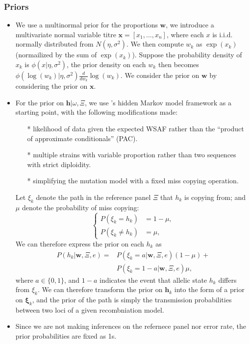 \documentclass{bioinfo}
\begin{document}
\subsubsection{Priors}
\begin{itemize}
\item We use a multinormal prior for the proportions $\mathbf{w}$, we introduce a multivariate normal variable titre ${\mathbf x} = [x_1,\dots,x_n]$, where each $x$ is i.i.d. normally distributed from $N(\eta, \sigma^2)$. We then compute $w_k$ as $\exp(x_k)$ (normailized by the sum of $\exp(x_k)$). Suppose the probability density of $x_k$ is $\phi(x|\eta, \sigma^2)$, the prior density on each $w_k$ then becomes $\phi(\log(w_k)|\eta, \sigma^2)\frac{d}{dw_k}\log(w_k)$. We consider the prior on $\mathbf{w}$ by considering the prior on $\mathbf{x}$.

\item For the prior on $\mathbf{h} | \omega, \Xi$, we use \citet{Li2003}'s hidden Markov model framework as a starting point, with the following modifications made:
\begin{itemize}
\item[*] likelihood of data given the expected WSAF rather than the ``product of approximate conditionals'' (PAC).
\item[*] multiple strains with variable proportion rather than two sequences with strict diploidity.
\item[*] simplifying the mutation model with a fixed miss copying operation.
\end{itemize}

Let $\xi_k$ denote the path in the reference panel $\Xi$ that $h_k$ is copying from; and $\mu$ denote the probability of miss copying:
$$\begin{cases}
P(\xi_k = h_k) &= 1-\mu, \\
P(\xi_k \neq h_k) &= \mu,\end{cases}$$
We can therefore express the prior on each $h_k$ as
\begin{align*}
P (h_k|\mathbf{w}, \Xi, e) = & P (\xi_k = a|\mathbf{w}, \Xi, e) (1-\mu) +\\
                             & P (\xi_k = 1-a|\mathbf{w}, \Xi, e) \mu,
\end{align*}
where $a \in \{0, 1\}$, and $1-a$ indicates the event that allelic state $h_k$ differs from $\xi_k$. We can therefore transform the prior on $\mathbf{h}_k$ into the form of a prior on $\mathbf{\xi}_k$, and the prior of the path is simply the transmission probabilities between two loci of a given recombniation model.

\item Since we are not making inferences on the refernece panel nor error rate, the prior probabilities are fixed as 1s.
\end{itemize}
\end{document}
